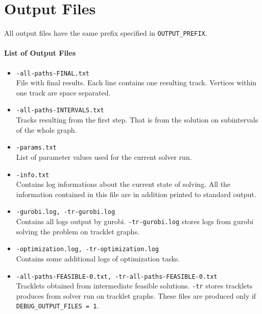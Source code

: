 \documentclass[a4paper,10pt]{article}
\begin{document}
\section{Output Files}
All output files have the same prefix specified in \texttt{OUTPUT\_PREFIX}. 
\paragraph{List of Output Files}
\begin{itemize}
\item \texttt{-all-paths-FINAL.txt}\\
File with final results. Each line contains one resulting track. Vertices within one track are space separated.
\item \texttt{-all-paths-INTERVALS.txt}\\
Tracks resulting from the first step. That is from the solution on subintervals of the whole graph.
\item \texttt{-params.txt}\\
List of parameter values used for the current solver run.
\item \texttt{-info.txt}\\
Contains log informations about the current state of solving. All the information contained in this file are in addition printed to standard output.
\item \texttt{-gurobi.log, -tr-gurobi.log}\\
Contains all logs output by gurobi. \texttt{-tr-gurobi.log} stores logs from gurobi solving the problem on tracklet graphs.
\item \texttt{-optimization.log, -tr-optimization.log}\\
Contains some additional logs of optimization tasks. 
\item \texttt{-all-paths-FEASIBLE-0.txt, -tr-all-paths-FEASIBLE-0.txt}\\
Tracklets obtained from intermediate feasible solutions. \texttt{-tr} stores tracklets produces from solver run on tracklet graphs. These files are produced only if \texttt{DEBUG\_OUTPUT\_FILES = 1}.
\end{itemize}
\end{document}
